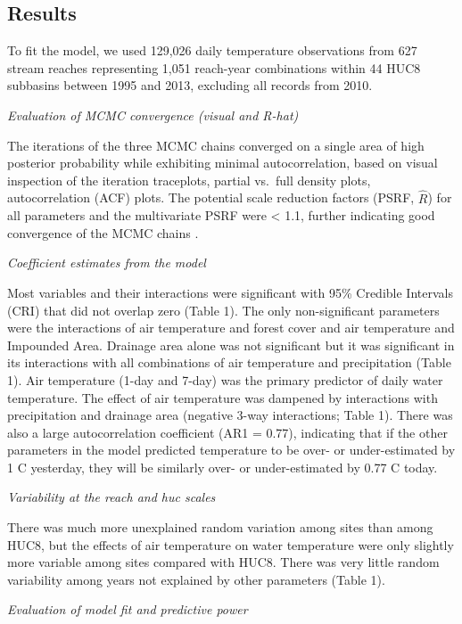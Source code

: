 \documentclass[]{article}
\begin{document}
\subsection{Results}\label{results}

To fit the model, we used 129,026 daily temperature observations from
627 stream reaches representing 1,051 reach-year combinations within 44
HUC8 subbasins between 1995 and 2013, excluding all records from 2010.

\emph{Evaluation of MCMC convergence (visual and R-hat)}

The iterations of the three MCMC chains converged on a single area of
high posterior probability while exhibiting minimal autocorrelation,
based on visual inspection of the iteration traceplots, partial vs.~full
density plots, autocorrelation (ACF) plots. The potential scale
reduction factors (PSRF, \(\hat{R}\)) for all parameters and the
multivariate PSRF were \textless{} 1.1, further indicating good
convergence of the MCMC chains \citep{Brooks1998}.

\emph{Coefficient estimates from the model}

Most variables and their interactions were significant with 95\%
Credible Intervals (CRI) that did not overlap zero (Table 1). The only
non-significant parameters were the interactions of air temperature and
forest cover and air temperature and Impounded Area. Drainage area alone
was not significant but it was significant in its interactions with all
combinations of air temperature and precipitation (Table 1). Air
temperature (1-day and 7-day) was the primary predictor of daily water
temperature. The effect of air temperature was dampened by interactions
with precipitation and drainage area (negative 3-way interactions; Table
1). There was also a large autocorrelation coefficient (AR1 = 0.77),
indicating that if the other parameters in the model predicted
temperature to be over- or under-estimated by 1 C yesterday, they will
be similarly over- or under-estimated by 0.77 C today.

\emph{Variability at the reach and huc scales}

There was much more unexplained random variation among sites than among
HUC8, but the effects of air temperature on water temperature were only
slightly more variable among sites compared with HUC8. There was very
little random variability among years not explained by other parameters
(Table 1).

\emph{Evaluation of model fit and predictive power}
\end{document}
